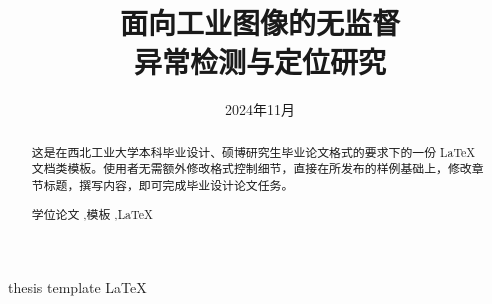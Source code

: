 \documentclass[lang=chs, degree=master, blindreview=false, adobe=false]{yanputhesis}
\title{面向工业图像的无监督 \\ 异常检测与定位研究}{          %
   The study of unsupervised anomaly detection and localization for industrial images
}                                                           %
\author{\blindreview{涂山川}}{\blindreview{Shanchuan Tu}}  %
\date{2024年11月}{Nov 2024}                                  %
\begin{document}
\frontmatter                                                %
\maketitle                                                  %
\begin{abstract}                                            %
    这是在西北工业大学本科毕业设计、硕博研究生毕业论文格式的要求下的一份 LaTeX
    文档类模板。使用者无需额外修改格式控制细节，直接在所发布的样例基础上，修改章
    节标题，撰写内容，即可完成毕业设计论文任务。            %
    \begin{keywords}                                        %
        学位论文 \sep 模板 \sep \LaTeX                      %
    \end{keywords}                                          %
\end{abstract}                                              %
\begin{engabstract}                                         %
    \noindent \blindtext                                    %
    \begin{engkeywords}                                     %
        thesis \ensep template \ensep \LaTeX                %
    \end{engkeywords}                                       %
\end{engabstract}                                           %
\tableofcontents                                            %
\listoffigures                                              %
\listoftables                                               %
\printnomenclature                                          %
\mainmatter
\sDefault
\end{document}
